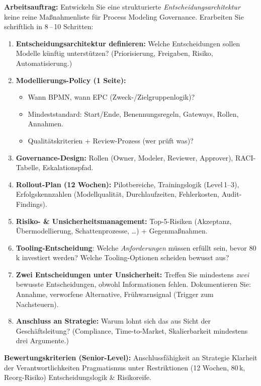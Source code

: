 \documentclass[11pt,a4paper,oneside]{article}
\begin{document}
\noindent\textbf{Arbeitsauftrag:} Entwickeln Sie eine strukturierte \emph{Entscheidungsarchitektur} \textendash{} keine reine Ma{\ss}nahmenliste \textendash{} f\"ur Process Modeling Governance. Erarbeiten Sie schriftlich in 8\,--\,10 Schritten:

\begin{enumerate}
  \item \textbf{Entscheidungsarchitektur definieren:} Welche Entscheidungen sollen Modelle k\"unftig unterst\"utzen? (Priorisierung, Freigaben, Risiko, Automatisierung.)
  \item \textbf{Modellierungs-Policy (1 Seite):}
    \begin{itemize}
      \item Wann BPMN, wann EPC (Zweck-/Zielgruppenlogik)?
      \item Mindeststandard: Start/Ende, Benennungsregeln, Gateways, Rollen, Annahmen.
      \item Qualit\"atskriterien + Review-Prozess (wer pr\"uft was)?
    \end{itemize}
  \item \textbf{Governance-Design:} Rollen (Owner, Modeler, Reviewer, Approver), RACI-Tabelle, Eskalationspfad.
  \item \textbf{Rollout-Plan (12 Wochen):} Pilotbereiche, Trainingslogik (Level\,1--3), Erfolgskennzahlen (Modellqualit\"at, Durchlaufzeiten, Fehlerkosten, Audit-Findings).
  \item \textbf{Risiko- \& Unsicherheitsmanagement:} Top-5-Risiken (Akzeptanz, \"Ubermodellierung, Schattenprozesse, \ldots) + Gegenma{\ss}nahmen.
  \item \textbf{Tooling-Entscheidung}: Welche \emph{Anforderungen} m\"ussen erf\"ullt sein, bevor 80\,k investiert werden? Welche Tooling-Optionen scheiden bewusst aus?
  \item \textbf{Zwei Entscheidungen unter Unsicherheit:} Treffen Sie mindestens \emph{zwei} bewusste Entscheidungen, obwohl Informationen fehlen. Dokumentieren Sie: Annahme, verworfene Alternative, Fr\"uhwarnsignal (Trigger zum Nachsteuern).
  \item \textbf{Anschluss an Strategie:} Warum lohnt sich das aus Sicht der Gesch\"aftsleitung? (Compliance, Time-to-Market, Skalierbarkeit \textendash{} mindestens drei Argumente.)
\end{enumerate}

\noindent\textbf{Bewertungskriterien (Senior-Level):} Anschlussf\"ahigkeit an Strategie \textperiodcentered{} Klarheit der Verantwortlichkeiten \textperiodcentered{} Pragmatismus unter Restriktionen (12 Wochen, 80\,k, Reorg-Risiko) \textperiodcentered{} Entscheidungslogik \& Risikoreife.
\end{document}
